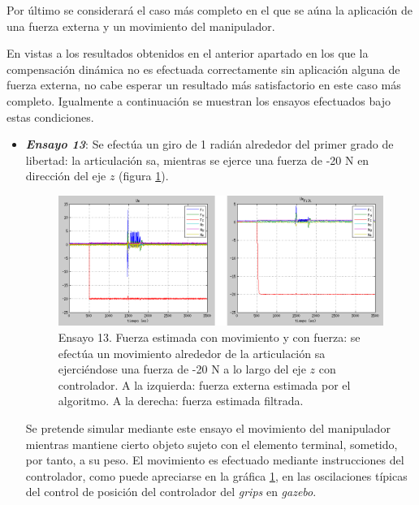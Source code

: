 Por último se considerará el caso más completo en el que se aúna la aplicación de una fuerza externa y un movimiento del manipulador. \par 

En vistas a los resultados obtenidos en el anterior apartado en los que la compensación dinámica no es efectuada correctamente sin aplicación alguna de fuerza externa, no cabe esperar un resultado más satisfactorio en este caso más completo. Igualmente a continuación se muestran los ensayos efectuados bajo estas condiciones. \par 

\begin{itemize}
\item \textbf{\emph{Ensayo 13}}: Se efectúa un giro de 1 radián alrededor del primer grado de libertad: la articulación \acrshort{sa}, mientras se ejerce una fuerza de -20 N en dirección del eje $z$ (figura \ref{fig:cmcf-SA-Fz}). \par 

\begin{figure}[h!]
\centering
\includegraphics[scale=0.4]{Figuras/cmcf-SA-Fz}
\caption[Ensayo 13. Fuerza estimada con movimiento y con fuerza]{Ensayo 13. Fuerza estimada con movimiento y con fuerza: se efectúa un movimiento alrededor de la articulación \acrshort{sa} ejerciéndose una fuerza de -20 N a lo largo del eje $z$ con controlador. A la izquierda: fuerza externa estimada por el algoritmo. A la derecha: fuerza estimada filtrada.}
\label{fig:cmcf-SA-Fz}
\end{figure}

Se pretende simular mediante este ensayo el movimiento del manipulador mientras mantiene cierto objeto sujeto con el elemento terminal, sometido, por tanto, a su peso. El movimiento es efectuado mediante instrucciones del controlador, como puede apreciarse en la gráfica \ref{fig:cmcf-SA-Fz}, en las oscilaciones típicas del control de posición del controlador del \emph{grips} en \emph{gazebo}. \par 


\end{itemize}
